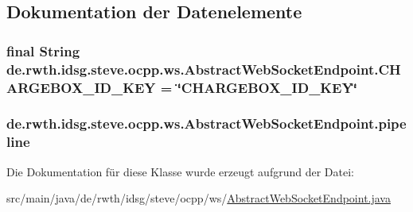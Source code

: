 \subsection{Dokumentation der Datenelemente}
\hypertarget{classde_1_1rwth_1_1idsg_1_1steve_1_1ocpp_1_1ws_1_1_abstract_web_socket_endpoint_a4ebea42decdb880f9f3a8a33e73cf4e7}{
\subsubsection[{C\-H\-A\-R\-G\-E\-B\-O\-X\-\_\-\-I\-D\-\_\-\-K\-E\-Y}]{\setlength{\rightskip}{0pt plus 5cm}final String de.\-rwth.\-idsg.\-steve.\-ocpp.\-ws.\-Abstract\-Web\-Socket\-Endpoint.\-C\-H\-A\-R\-G\-E\-B\-O\-X\-\_\-\-I\-D\-\_\-\-K\-E\-Y = \char`\"{}C\-H\-A\-R\-G\-E\-B\-O\-X\-\_\-\-I\-D\-\_\-\-K\-E\-Y\char`\"{}\hspace{0.3cm}{\ttfamily [static]}}}\label{classde_1_1rwth_1_1idsg_1_1steve_1_1ocpp_1_1ws_1_1_abstract_web_socket_endpoint_a4ebea42decdb880f9f3a8a33e73cf4e7}
\hypertarget{classde_1_1rwth_1_1idsg_1_1steve_1_1ocpp_1_1ws_1_1_abstract_web_socket_endpoint_ad702702e9550fea4384b0b0e8dbf05ff}{
\subsubsection[{pipeline}]{ de.\-rwth.\-idsg.\-steve.\-ocpp.\-ws.\-Abstract\-Web\-Socket\-Endpoint.\-pipeline\hspace{0.3cm}{\ttfamily [protected]}}}\label{classde_1_1rwth_1_1idsg_1_1steve_1_1ocpp_1_1ws_1_1_abstract_web_socket_endpoint_ad702702e9550fea4384b0b0e8dbf05ff}


Die Dokumentation für diese Klasse wurde erzeugt aufgrund der Datei\-:\begin{DoxyCompactItemize}
\item 
src/main/java/de/rwth/idsg/steve/ocpp/ws/\hyperlink{_abstract_web_socket_endpoint_8java}{Abstract\-Web\-Socket\-Endpoint.\-java}\end{DoxyCompactItemize}
